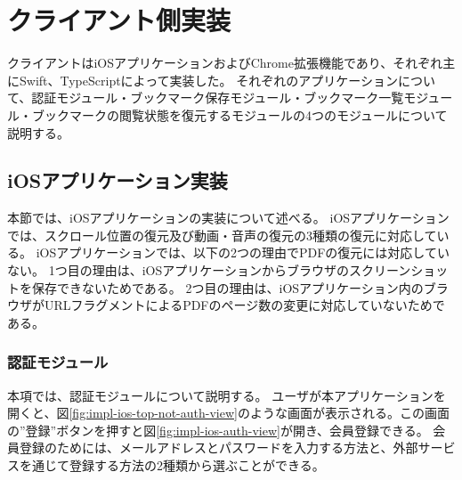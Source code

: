 

\section{クライアント側実装}
クライアントはiOSアプリケーションおよびChrome拡張機能であり、それぞれ主にSwift、TypeScriptによって実装した。
それぞれのアプリケーションについて、認証モジュール・ブックマーク保存モジュール・ブックマーク一覧モジュール・ブックマークの閲覧状態を復元するモジュールの4つのモジュールについて説明する。

\subsection{iOSアプリケーション実装}
本節では、iOSアプリケーションの実装について述べる。
iOSアプリケーションでは、スクロール位置の復元及び動画・音声の復元の3種類の復元に対応している。
iOSアプリケーションでは、以下の2つの理由でPDFの復元には対応していない。
1つ目の理由は、iOSアプリケーションからブラウザのスクリーンショットを保存できないためである。
2つ目の理由は、iOSアプリケーション内のブラウザがURLフラグメントによるPDFのページ数の変更に対応していないためである。

\subsubsection{認証モジュール}
本項では、認証モジュールについて説明する。
ユーザが本アプリケーションを開くと、図\ref{fig:impl-ios-top-not-auth-view}のような画面が表示される。この画面の”登録”ボタンを押すと図\ref{fig:impl-ios-auth-view}が開き、会員登録できる。
会員登録のためには、メールアドレスとパスワードを入力する方法と、外部サービスを通じて登録する方法の2種類から選ぶことができる。


